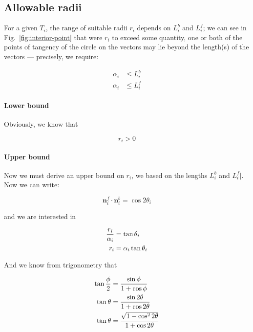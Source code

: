 \documentclass{article}
\begin{document}
\subsection{Allowable radii}

For a given $T_{i}$, the range of suitable radii $r_{i}$ depends on $L^b_i$ and $L^f_i$; we can see in Fig.~\ref{fig:interior-point} that were $r_{i}$ to exceed some quantity, one or both of the points of tangency of the circle on the vectors may lie beyond the length(s) of the vectors --- precisely, we require:

\begin{align}
  \label{eq:alphalimit-b}
  \alpha_i &\le L^{b}_{i}\\
  \label{eq:alphalimit-f}
  \alpha_i &\le L^{f}_{i}
\end{align}

\paragraph{Lower bound}

Obviously, we know that

\begin{equation}
  \label{eq:rlow}
  r_i > 0
\end{equation}

\paragraph{Upper bound}

Now we must derive an upper bound on $r_{i}$, we based on the lengths $L^b_i$ and $L^f_i|$.  Now we can write:

\begin{equation}
  \label{eq:dotnorm}
  \mathbf{n}^{f}_{i} \cdot \mathbf{n}^{b}_{i} = \cos 2\theta_i
\end{equation}

and we are interested in

\begin{align}
  \notag
  \frac{r_i}{\alpha_{i}} &= \tan \theta_i\\
  \label{eq:tantheta}
  r_i &= \alpha_{i}\tan \theta_i
\end{align}

And we know from trigonometry that

\begin{align}
  \notag
  \tan \frac{\phi}{2} &= \frac{\sin\phi}{1+\cos\phi}\\
  \notag
  \tan \theta &= \frac{\sin 2\theta}{1+\cos 2\theta}\\
  \label{eq:tanident}
  \tan \theta &= \frac{\sqrt{1-\cos^{2} 2\theta}}{1+\cos 2\theta}
\end{align}
\end{document}
